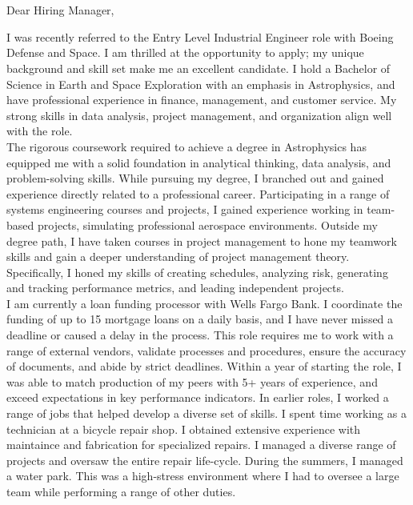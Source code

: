\section{}




\bigskip

Dear Hiring Manager,

\bigskip
\bigskip


\hspace{1cm}I was recently referred to the Entry Level Industrial Engineer  role with Boeing Defense and Space. I am thrilled at the opportunity to apply; my unique background and skill set make me an excellent candidate. I hold a Bachelor of Science in Earth and Space Exploration with an emphasis in Astrophysics, and have professional experience in finance, management, and customer service. My strong skills in data analysis, project management, and organization align well with the role. \\
\medskip
\hspace{1cm}The rigorous coursework required to achieve a degree in Astrophysics has equipped me with a solid foundation in analytical thinking, data analysis, and problem-solving skills. While pursuing my degree, I branched out and gained experience directly related to a professional career. Participating in a range of systems engineering courses and projects, I gained experience working in team-based projects, simulating professional aerospace environments. Outside my degree path, I have taken courses in project management to hone my teamwork skills and gain a deeper understanding of project management theory. Specifically, I honed my skills of creating schedules, analyzing risk, generating and tracking performance metrics, and leading independent projects. \\
\medskip
\hspace{1cm}I am currently a loan funding processor with Wells Fargo Bank. I coordinate the funding of up to 15 mortgage loans on a daily basis, and I have never missed a deadline or caused a delay in the process. This role requires me to work with a range of external vendors, validate processes and procedures, ensure the accuracy of documents, and abide by strict deadlines. Within a year of starting the role, I was able to match production of my peers with 5+ years of experience, and exceed expectations in key performance indicators. In earlier roles, I worked a range of jobs that helped develop a diverse set of skills. I spent time working as a technician at a bicycle repair shop. I obtained extensive experience with maintaince and fabrication for specialized repairs. I managed a diverse range of projects and oversaw the entire repair life-cycle. During the summers, I managed a water park. This was a high-stress environment where I had to oversee a large team while performing a range of other duties. \\
